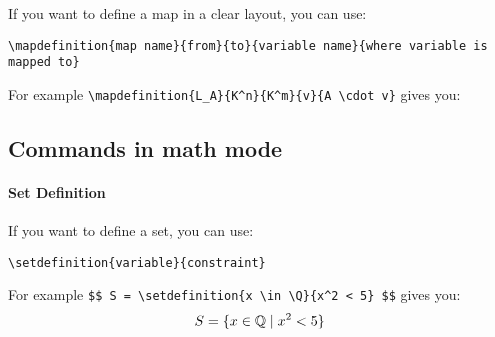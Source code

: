 \documentclass[11pt, a4paper]{article}
\begin{document}
If you want to define a map in a clear layout, you can use:
\begin{center}\verb|\mapdefinition{map name}{from}{to}{variable name}{where variable is mapped to}|\end{center}
For example \verb|\mapdefinition{L_A}{K^n}{K^m}{v}{A \cdot v}| gives you:

\subsection{Commands in math mode}

\paragraph{Set Definition}

If you want to define a set, you can use:
\begin{center}\verb|\setdefinition{variable}{constraint}|\end{center}
For example \verb|$$ S = \setdefinition{x \in \Q}{x^2 < 5} $$| gives you:
$$ S = \{x \in \mathbb{Q} \mid x^2 < 5\} $$
\end{document}

